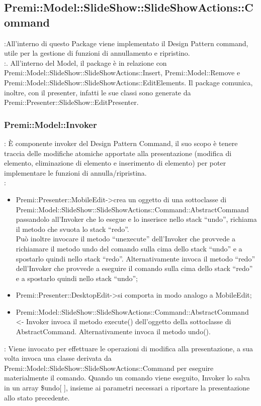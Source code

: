    \subsection{Premi::Model::SlideShow::SlideShowActions::Command}{
		\textbf{\tipo}:All’interno di questo Package viene implementato il Design Pattern command, utile per la gestione di funzioni di annullamento e ripristino.\\
		\textbf{\relaz}:. All’interno del Model, il package è in relazione con Premi::Model::SlideShow::SlideShowActions::Insert, Premi::Model::Remove e Premi::Model::SlideShow::SlideShowActions::EditElements. Il package comunica, inoltre, con il presenter, infatti le sue classi sono generate da Premi::Presenter::SlideShow::EditPresenter.\\
	\subsubsection{Premi::Model::Invoker}{
		\textbf{\tipo}: È componente invoker del Design Pattern Command, il suo scopo è tenere traccia delle modifiche atomiche apportate alla presentazione (modifica di elemento, eliminazione di elemento e inserimento di elemento) per poter implementare le funzioni di annulla/ripristina.\\	
		\textbf{\relaz}:
		\begin{itemize}
			\item Premi::Presenter::MobileEdit->crea un oggetto di una sottoclasse di Premi::Model::SlideShow::SlideShowActions::Command::AbstractCommand passandolo all’Invoker che lo esegue e lo inserisce nello stack “undo”, richiama il metodo che svuota lo stack “redo”.\\
			Può inoltre invocare il  metodo “unexecute” dell’Invoker che provvede a richiamare il metodo undo del comando sulla cima dello stack “undo” e a spostarlo quindi nello stack “redo”. Alternativamente invoca il  metodo “redo” dell’Invoker che provvede a eseguire il comando sulla cima dello stack “redo” e a spostarlo quindi nello stack “undo”;
			\item Premi::Presenter::DesktopEdit->si comporta in modo analogo a MobileEdit;
			\item Premi::Model::SlideShow::SlideShowActions::Command::AbstractCommand <- Invoker invoca il metodo execute() dell'oggetto della sottoclasse di AbstractCommand. Alternativamente invoca il metodo undo().
		\end{itemize} 
		\textbf{\interfacce}: Viene invocato per effettuare le operazioni di modifica alla presentazione, a sua volta invoca una classe derivata da Premi::Model::SlideShow::SlideShowActions::Command per eseguire materialmente il comando. Quando un comando viene eseguito, Invoker lo salva in un array \$undo[ ], insieme ai parametri necessari a riportare la presentazione allo stato precedente.\\
	}
}
